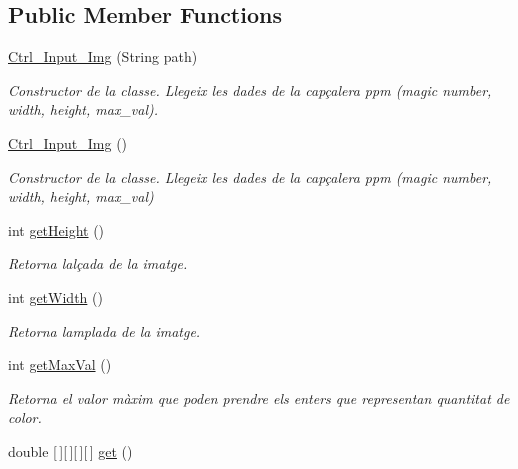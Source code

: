 \subsection*{Public Member Functions}
\begin{DoxyCompactItemize}
\item 
\hyperlink{classpersistencia_1_1input_1_1Ctrl__Input__Img_a79318a62df31dfd107554e92e29f6d9a}{Ctrl\+\_\+\+Input\+\_\+\+Img} (String path)
\begin{DoxyCompactList}\small\item\em Constructor de la classe. Llegeix les dades de la capçalera ppm (magic number, width, height, max\+\_\+val). \end{DoxyCompactList}\item 
\hyperlink{classpersistencia_1_1input_1_1Ctrl__Input__Img_a835112b79aac4bcca9757b230063cbd4}{Ctrl\+\_\+\+Input\+\_\+\+Img} ()
\begin{DoxyCompactList}\small\item\em Constructor de la classe. Llegeix les dades de la capçalera ppm (magic number, width, height, max\+\_\+val) \end{DoxyCompactList}\item 
int \hyperlink{classpersistencia_1_1input_1_1Ctrl__Input__Img_a55dc2906950235559f83b4765aea73e8}{get\+Height} ()
\begin{DoxyCompactList}\small\item\em Retorna l\textquotesingle{}alçada de la imatge. \end{DoxyCompactList}\item 
int \hyperlink{classpersistencia_1_1input_1_1Ctrl__Input__Img_ab4cda237a52c99efb4411e0e86f3d3a2}{get\+Width} ()
\begin{DoxyCompactList}\small\item\em Retorna l\textquotesingle{}amplada de la imatge. \end{DoxyCompactList}\item 
int \hyperlink{classpersistencia_1_1input_1_1Ctrl__Input__Img_a53ec1b76b3fe590640ba6ed08adc2de2}{get\+Max\+Val} ()
\begin{DoxyCompactList}\small\item\em Retorna el valor màxim que poden prendre els enters que representan quantitat de color. \end{DoxyCompactList}\item 
double \mbox{[}$\,$\mbox{]}\mbox{[}$\,$\mbox{]}\mbox{[}$\,$\mbox{]}\mbox{[}$\,$\mbox{]} \hyperlink{classpersistencia_1_1input_1_1Ctrl__Input__Img_ac549527b5947a7ec9f40d53e492f4ffa}{get} ()
\end{DoxyCompactItemize}
